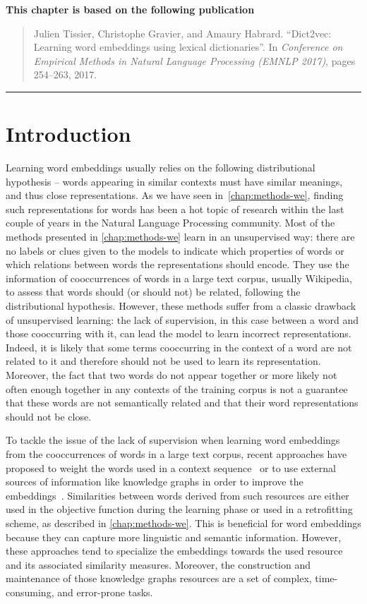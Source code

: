 {\centering
  \small
  \textbf{This chapter is based on the following publication}
  \begin{quote}
    {Julien Tissier, Christophe Gravier, and Amaury Habrard. ``Dict2vec:
    Learning word embeddings using lexical dictionaries''. In \textit{Conference
    on Empirical Methods in Natural Language Processing (EMNLP 2017)}, pages
    254–263, 2017.}
  \end{quote}
  \noindent\rule{\textwidth}{1pt}
}

\section{Introduction}
  Learning word embeddings usually relies on the following distributional
  hypothesis -- words appearing in similar contexts must have similar meanings,
  and thus close representations. As we have seen in~\autoref{chap:methods-we},
  finding such representations for words has been a hot topic of research within
  the last couple of years in the Natural Language Processing community. Most of
  the methods presented in \autoref{chap:methods-we} learn in an unsupervised
  way: there are no labels or clues given to the models to indicate which
  properties of words or which relations between words the representations
  should encode. They use the information of cooccurrences of words in a large
  text corpus, usually Wikipedia, to assess that words should (or should not) be
  related, following the distributional hypothesis. However, these methods
  suffer from a classic drawback of unsupervised learning: the lack of
  supervision, in this case between a word and those cooccurring with it, can
  lead the model to learn incorrect representations. Indeed, it is likely that
  some terms cooccurring in the context of a word are not related to it and
  therefore should not be used to learn its representation. Moreover, the fact
  that two words do not appear together or more likely not often enough together
  in any contexts of the training corpus is not a guarantee that these words are
  not semantically related and that their word representations should not be
  close.\medskip

  To tackle the issue of the lack of supervision when learning word embeddings
  from the cooccurrences of words in a large text corpus, recent approaches have
  proposed to weight the words used in a context
  sequence~\citep{vaswani2017attention} or to use external sources of
  information like knowledge graphs in order to improve the
  embeddings~\citep{faruqui2015retrofitting, kiela2015specializing}.
  Similarities between words derived from such resources are either used in the
  objective function during the learning phase or used in a retrofitting scheme,
  as described in \autoref{chap:methods-we}. This is beneficial for word
  embeddings because they can capture more linguistic and semantic information.
  However, these approaches tend to specialize the embeddings towards the used
  resource and its associated similarity measures. Moreover, the construction
  and maintenance of those knowledge graphs resources are a set of complex,
  time-consuming, and error-prone tasks.\medskip

